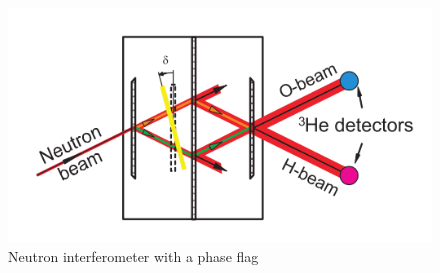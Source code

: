 \begin{figure}[ht!]
\centering
\includegraphics[scale=1.0]{Figures/phase_flag.png}
\caption{Neutron interferometer with a phase flag \cite{dimaThesis} }
\label{fig:phaseflag}
\end{figure}

